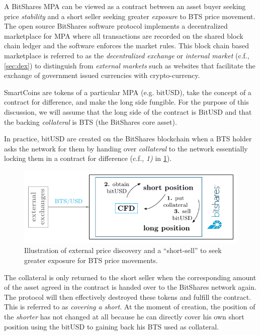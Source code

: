 \label{sec:mpa:create}

A BitShares MPA can be viewed as a contract between an asset buyer seeking
price \emph{stability} and a short seller seeking greater \emph{exposure} to
BTS price movement. The open source BitShares software protocol implements a
decentralized marketplace for MPA where all transactions are recorded on the
shared block chain ledger and the software enforces the market rules. This
block chain based marketplace is referred to as the \emph{decentralized
exchange} or \emph{internal market} (c.f., \cref{sec:dex}) to distinguish from
\emph{external markets} such as websites that facilitate the exchange of
government issued currencies with crypto-currency.

SmartCoins are tokens of a particular MPA (e.g. bitUSD), take the concept of a
contract for difference, and make the long side fungible. For the purpose of
this discussion, we will assume that the long side of the contract is BitUSD
and that the backing \emph{collateral} is BTS (the BitShares core asset).

In practice, bitUSD are created on the BitShares blockchain when a BTS holder
asks the network for them by handing over \emph{collateral} to the network
essentially locking them in a contract for difference (c.f., \emph{1)} in
\cref{fig:btsdex}).

\begin{figure}[!htp]
 \begin{center}
  \includegraphics[width=.8\linewidth]{figures/external-pricefeed}
 \end{center}
 \caption{Illustration of external price discovery and a ``short-sell'' to seek
          greater exposure for BTS price movements.}
 \label{fig:btsdex}
\end{figure}

The collateral is only returned to the short seller when the corresponding
amount of the asset agreed in the contract is handed over to the BitShares
network again. The protocol will then effectively destroyed these tokens and
fulfill the contract. This is referred to as \emph{covering a
short}. At the moment of creation, the position of the \emph{shorter} has not
changed at all because he can directly cover his own short position using the
bitUSD to gaining back his BTS used as collateral.

